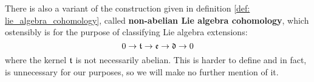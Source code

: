         \begin{remark}
            There is also a variant of the construction given in definition \ref{def: lie_algebra_cohomology}, called \textbf{non-abelian Lie algebra cohomology}, which ostensibly is for the purpose of classifying Lie algebra extensions:
                $$0 \to \mathfrak{t} \to \mathfrak{e} \to \mathfrak{d} \to 0$$
            where the kernel $\mathfrak{t}$ is not necessarily abelian. This is harder to define and in fact, is unnecessary for our purposes, so we will make no further mention of it.
        \end{remark}